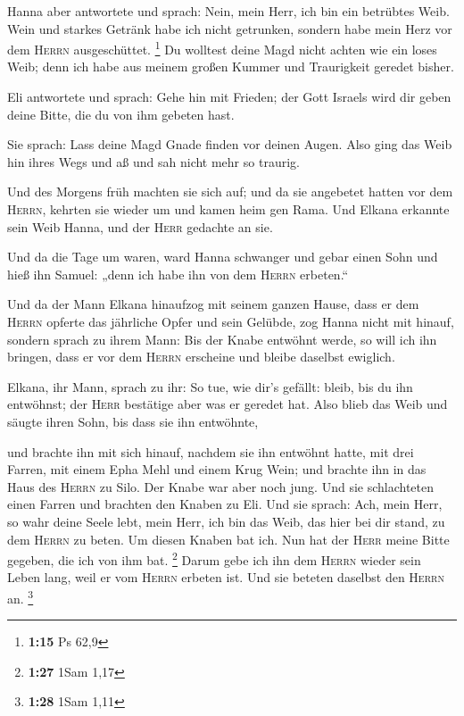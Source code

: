  Hanna aber antwortete und sprach: Nein, mein Herr, ich
bin ein betrübtes Weib. Wein und starkes Getränk habe ich nicht
getrunken, sondern habe mein Herz vor dem \textsc{Herrn} ausgeschüttet.
\footnote{\textbf{1:15} Ps 62,9}  Du wolltest deine Magd
nicht achten wie ein loses Weib; denn ich habe aus meinem großen Kummer
und Traurigkeit geredet bisher.

 Eli antwortete und sprach: Gehe hin mit Frieden; der
Gott Israels wird dir geben deine Bitte, die du von ihm gebeten hast.

 Sie sprach: Lass deine Magd Gnade finden vor deinen
Augen. Also ging das Weib hin ihres Wegs und aß und sah nicht mehr so
traurig.

 Und des Morgens früh machten sie sich auf; und da sie
angebetet hatten vor dem \textsc{Herrn}, kehrten sie wieder um und kamen
heim gen Rama. Und Elkana erkannte sein Weib Hanna, und der
\textsc{Herr} gedachte an sie.

 Und da die Tage um waren, ward Hanna schwanger und gebar
einen Sohn und hieß ihn Samuel: „denn ich habe ihn von dem
\textsc{Herrn} erbeten.``

 Und da der Mann Elkana hinaufzog mit seinem ganzen
Hause, dass er dem \textsc{Herrn} opferte das jährliche Opfer und sein
Gelübde,  zog Hanna nicht mit hinauf, sondern sprach zu
ihrem Mann: Bis der Knabe entwöhnt werde, so will ich ihn bringen, dass
er vor dem \textsc{Herrn} erscheine und bleibe daselbst ewiglich.

 Elkana, ihr Mann, sprach zu ihr: So tue, wie dir's
gefällt: bleib, bis du ihn entwöhnst; der \textsc{Herr} bestätige aber
was er geredet hat. Also blieb das Weib und säugte ihren Sohn, bis dass
sie ihn entwöhnte,

 und brachte ihn mit sich hinauf, nachdem sie ihn
entwöhnt hatte, mit drei Farren, mit einem Epha Mehl und einem Krug
Wein; und brachte ihn in das Haus des \textsc{Herrn} zu Silo. Der Knabe
war aber noch jung.  Und sie schlachteten einen Farren
und brachten den Knaben zu Eli.  Und sie sprach: Ach,
mein Herr, so wahr deine Seele lebt, mein Herr, ich bin das Weib, das
hier bei dir stand, zu dem \textsc{Herrn} zu beten.  Um
diesen Knaben bat ich. Nun hat der \textsc{Herr} meine Bitte gegeben,
die ich von ihm bat. \footnote{\textbf{1:27} 1Sam 1,17} 
Darum gebe ich ihn dem \textsc{Herrn} wieder sein Leben lang, weil er
vom \textsc{Herrn} erbeten ist. Und sie beteten daselbst den
\textsc{Herrn} an. \footnote{\textbf{1:28} 1Sam 1,11}

